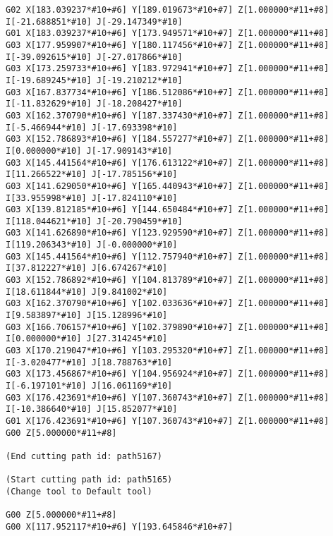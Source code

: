 \begin{lstlisting}[caption={App4-Display full listing for 2D KSG G-Code}, label=App4-Display full listing for 2D KSG G-Code]
G02 X[183.039237*#10+#6] Y[189.019673*#10+#7] Z[1.000000*#11+#8] I[-21.688851*#10] J[-29.147349*#10]
G01 X[183.039237*#10+#6] Y[173.949571*#10+#7] Z[1.000000*#11+#8]
G03 X[177.959907*#10+#6] Y[180.117456*#10+#7] Z[1.000000*#11+#8] I[-39.092615*#10] J[-27.017866*#10]
G03 X[173.259733*#10+#6] Y[183.972941*#10+#7] Z[1.000000*#11+#8] I[-19.689245*#10] J[-19.210212*#10]
G03 X[167.837734*#10+#6] Y[186.512086*#10+#7] Z[1.000000*#11+#8] I[-11.832629*#10] J[-18.208427*#10]
G03 X[162.370790*#10+#6] Y[187.337430*#10+#7] Z[1.000000*#11+#8] I[-5.466944*#10] J[-17.693398*#10]
G03 X[152.786893*#10+#6] Y[184.557277*#10+#7] Z[1.000000*#11+#8] I[0.000000*#10] J[-17.909143*#10]
G03 X[145.441564*#10+#6] Y[176.613122*#10+#7] Z[1.000000*#11+#8] I[11.266522*#10] J[-17.785156*#10]
G03 X[141.629050*#10+#6] Y[165.440943*#10+#7] Z[1.000000*#11+#8] I[33.955998*#10] J[-17.824110*#10]
G03 X[139.812185*#10+#6] Y[144.650484*#10+#7] Z[1.000000*#11+#8] I[118.044621*#10] J[-20.790459*#10]
G03 X[141.626890*#10+#6] Y[123.929590*#10+#7] Z[1.000000*#11+#8] I[119.206343*#10] J[-0.000000*#10]
G03 X[145.441564*#10+#6] Y[112.757940*#10+#7] Z[1.000000*#11+#8] I[37.812227*#10] J[6.674267*#10]
G03 X[152.786892*#10+#6] Y[104.813789*#10+#7] Z[1.000000*#11+#8] I[18.611844*#10] J[9.841002*#10]
G03 X[162.370790*#10+#6] Y[102.033636*#10+#7] Z[1.000000*#11+#8] I[9.583897*#10] J[15.128996*#10]
G03 X[166.706157*#10+#6] Y[102.379890*#10+#7] Z[1.000000*#11+#8] I[0.000000*#10] J[27.314245*#10]
G03 X[170.219047*#10+#6] Y[103.295320*#10+#7] Z[1.000000*#11+#8] I[-3.020477*#10] J[18.788763*#10]
G03 X[173.456867*#10+#6] Y[104.956924*#10+#7] Z[1.000000*#11+#8] I[-6.197101*#10] J[16.061169*#10]
G03 X[176.423691*#10+#6] Y[107.360743*#10+#7] Z[1.000000*#11+#8] I[-10.386640*#10] J[15.852077*#10]
G01 X[176.423691*#10+#6] Y[107.360743*#10+#7] Z[1.000000*#11+#8]
G00 Z[5.000000*#11+#8]

(End cutting path id: path5167)

(Start cutting path id: path5165)
(Change tool to Default tool)

G00 Z[5.000000*#11+#8]
G00 X[117.952117*#10+#6] Y[193.645846*#10+#7]


\end{lstlisting}
